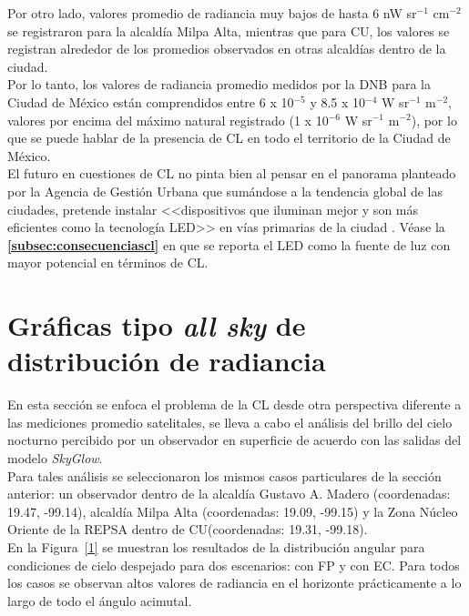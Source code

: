 \newpage

Por otro lado, valores promedio de radiancia muy bajos de hasta 6 nW sr$^{-1}$  cm$^{-2}$ se registraron para la alcaldía Milpa Alta, mientras que para CU, los valores se registran alrededor de los promedios observados en otras alcaldías dentro de la ciudad.\\

Por lo tanto, los valores de radiancia promedio medidos por la DNB para la Ciudad de México están comprendidos entre 6 x 10$^{-5}$ y 8.5 x 10$^{-4}$ W sr$^{-1}$ m$^{-2}$, valores por encima del máximo natural registrado (1 x 10$^{-6}$ W sr$^{-1}$  m$^{-2}$), por lo que se puede hablar de la presencia de CL en todo el territorio de la Ciudad de México.\\ 

El futuro en cuestiones de CL no pinta bien al pensar en el panorama planteado por la Agencia de Gestión Urbana que sumándose a la tendencia global de las ciudades, pretende instalar <<dispositivos que iluminan mejor y son más eficientes como la tecnología LED>> en vías primarias de la ciudad \citep{Universal2017}. Véase la \textbf{\autoref{subsec:consecuenciascl}} en que se reporta el LED como la fuente de luz con mayor potencial en términos de CL.\\ 


\section{Gráficas tipo \textit{all sky} de distribución de radiancia}

En esta sección se enfoca el problema de la CL desde otra perspectiva diferente a las mediciones promedio satelitales, se lleva a cabo el análisis del brillo del cielo nocturno percibido por un observador en superficie de acuerdo con las salidas del modelo \textit{SkyGlow}.\\ 

Para tales análisis se seleccionaron los mismos casos particulares de la sección anterior: un observador dentro de la alcaldía Gustavo A. Madero (coordenadas: 19.47\grad, -99.14\grad), alcaldía Milpa Alta (coordenadas: 19.09\grad, -99.15\grad) y la Zona Núcleo Oriente de la REPSA dentro de CU(coordenadas: 19.31\grad, -99.18\grad).\\

En la Figura~\ref{1} se muestran los resultados de la distribución angular para condiciones de cielo despejado para dos escenarios: con FP y con EC. Para todos los casos se observan altos valores de radiancia en el horizonte prácticamente a lo largo de todo el ángulo acimutal.\\

